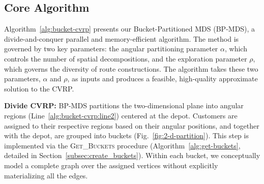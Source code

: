 

\subsection{Core Algorithm}
\label{subsec::algorithm}

Algorithm~\ref{alg:bucket-cvrp} presents our Bucket-Partitioned MDS (BP-MDS), a divide-and-conquer parallel and memory-efficient algorithm. The method is governed by two key parameters: the angular partitioning parameter $\alpha$, which controls the number of spatial decompositions, and the exploration parameter $\rho$, which governs the diversity of route constructions. The algorithm takes these two parameters, $\alpha$ and $\rho$, as inputs and produces a feasible, high-quality approximate solution to the CVRP.

\textbf{Divide CVRP:} BP-MDS partitions the two-dimensional plane into angular regions (Line~\ref{alg:bucket-cvrp:line2}) centered at the depot. Customers are assigned to their respective regions based on their angular positions, and together with the depot, are grouped into buckets (Fig.~\ref{fig:2-d-partition}). This step is implemented via the \textsc{Get\_Buckets} procedure (Algorithm~\ref{alg:get-buckets}, detailed in Section~\ref{subsec:create_buckets}). Within each bucket, we conceptually model a complete graph over the assigned vertices without explicitly materializing all the edges.


